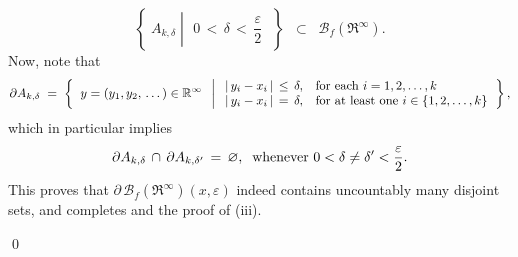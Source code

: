 \begin{enumerate}
	\begin{equation*}
	\left\{\;
	A_{k,\delta}
	\;\left\vert\;
	\begin{array}{c}
		0 \, < \, \delta \, < \, \dfrac{\varepsilon}{2}
	\end{array}
	\right.
	\;\right\}
	\;\; \subset \;\;
	\mathcal{B}_{f}(\Re^{\infty}).
	\end{equation*}
	Now, note that
	\begin{equation*}
	\partial A_{k,\delta}
	\;=\;
	\left\{\;\;
	y = (y_{1},y_{2},\,\ldots\,)\in\Re^{\infty}
	\;\;\left\vert\;
		\begin{array}{ll}
		\vert\,y_{i} - x_{i}\,\vert\,\leq\,\delta, &\textnormal{for each $i = 1,2,\ldots,k$}
		\\
		\vert\,y_{i} - x_{i}\,\vert\,=\,\delta, &\textnormal{for at least one $i \in \{1,2,\ldots,k\}$}
		\end{array}
	\right.
	\right\},
	\end{equation*}
	which in particular implies
	\begin{equation*}
	\partial A_{k,\delta} \,\cap\, \partial A_{k,\delta^{\prime}} \, = \, \varemptyset,
	\;\;\textnormal{whenever $0 < \delta \neq \delta^{\prime} < \dfrac{\varepsilon}{2}$}.
	\end{equation*}
	This proves that $\partial\,\mathcal{B}_{f}(\Re^{\infty})(x,\varepsilon)$ indeed
	contains uncountably many disjoint sets, and completes and the proof of (iii).
\end{enumerate}
\qed

